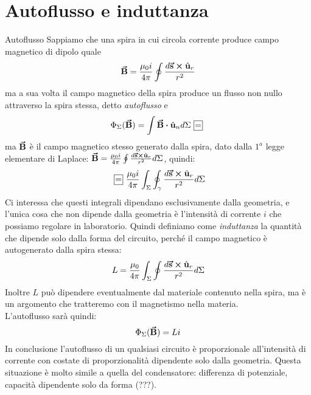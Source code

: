 \section{Autoflusso e induttanza}
Autoflusso
Sappiamo che una spira in cui circola corrente produce campo magnetico di dipolo quale
\begin{equation*}
	\vb*{\va{B}}=\frac{\mu_0i}{4\pi}\oint\frac{d\vb*{\va{s}}\cross \hat{\mathbf{u}}_r}{r^2}
\end{equation*}
ma a sua volta il campo magnetico della spira produce un flusso non nullo attraverso la spira stessa, detto \textit{autoflusso} e
\begin{gather*}
	\Phi_\Sigma(\vba B)=\int\vba B\vdot \vbh u_n d\Sigma \squarequal
\end{gather*}
ma $\vb*{\va{B}}$ è il campo magnetico stesso generato dalla spira, dato dalla $1^a$ legge elementare di Laplace: $\vb*{\va{B}}=\frac{\mu_0i}{4\pi}\oint \frac{d\vb*{\va{s}}\cross\hat{\mathbf{u}}_r}{r^2}d\Sigma$, quindi:
\begin{gather*}
	\squarequal\frac{\mu_0i}{4\pi}\int_\Sigma\oint_\gamma\frac{d\vba s\cross\vbh{u}_r}{r^2}d\Sigma
\end{gather*}
Ci interessa che questi integrali dipendano esclusivamente dalla geometria, e l'unica cosa che non dipende dalla geometria è l'intensità di corrente $i$ che possiamo regolare in laboratorio. Quindi definiamo come \textit{induttanza} la quantità che dipende solo dalla forma del circuito, perché il campo magnetico è autogenerato dalla spira stessa:
\begin{equation}
	L=\frac{\mu_0}{4\pi}\int_\Sigma\oint\frac{d\vb*{\va{s}}\cross\hat{\mathbf{u}}_r}{r^2}d\Sigma
\end{equation}
Inoltre $L$ può dipendere eventualmente dal materiale contenuto nella spira, ma è un argomento che tratteremo con il magnetismo nella materia.\\
L'autoflusso sarà quindi:
\begin{equation}
	\Phi_\Sigma(\vb*{\va{B}})=Li
\end{equation}
In conclusione l'autoflusso di un qualsiasi circuito è proporzionale all'intensità di corrente con costate di proporzionalità dipendente solo dalla geometria. Questa situazione è molto simile a quella del condensatore: differenza di potenziale, capacità dipendente solo da forma (???).

